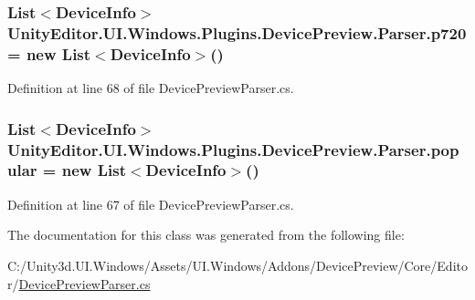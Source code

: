 \subsubsection[{p720}]{\setlength{\rightskip}{0pt plus 5cm}List$<${\bf Device\+Info}$>$ Unity\+Editor.\+U\+I.\+Windows.\+Plugins.\+Device\+Preview.\+Parser.\+p720 = new List$<${\bf Device\+Info}$>$()\hspace{0.3cm}{\ttfamily [static]}}\label{class_unity_editor_1_1_u_i_1_1_windows_1_1_plugins_1_1_device_preview_1_1_parser_ab68610960052dfb3c3be0c24f800ee32}


Definition at line 68 of file Device\+Preview\+Parser.\+cs.

\hypertarget{class_unity_editor_1_1_u_i_1_1_windows_1_1_plugins_1_1_device_preview_1_1_parser_add31e4b893338c1ed399d8e13a6f6ea7}{}
\subsubsection[{popular}]{\setlength{\rightskip}{0pt plus 5cm}List$<${\bf Device\+Info}$>$ Unity\+Editor.\+U\+I.\+Windows.\+Plugins.\+Device\+Preview.\+Parser.\+popular = new List$<${\bf Device\+Info}$>$()\hspace{0.3cm}{\ttfamily [static]}}\label{class_unity_editor_1_1_u_i_1_1_windows_1_1_plugins_1_1_device_preview_1_1_parser_add31e4b893338c1ed399d8e13a6f6ea7}


Definition at line 67 of file Device\+Preview\+Parser.\+cs.



The documentation for this class was generated from the following file\+:\begin{DoxyCompactItemize}
\item 
C\+:/\+Unity3d.\+U\+I.\+Windows/\+Assets/\+U\+I.\+Windows/\+Addons/\+Device\+Preview/\+Core/\+Editor/\hyperlink{_device_preview_parser_8cs}{Device\+Preview\+Parser.\+cs}\end{DoxyCompactItemize}
